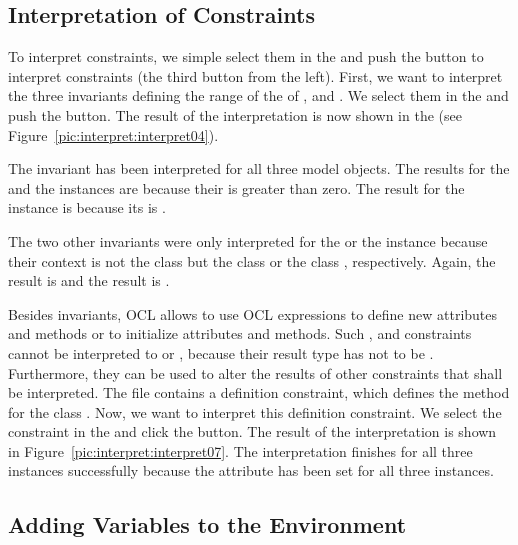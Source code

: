 \subsection{Interpretation of Constraints}

To interpret constraints, we simple select them in the  
and push the button to interpret constraints (the third button from the left). 
First, we want to interpret the three invariants defining the range of the 
 of ,  and . We 
select them in the  and push the  button.
The result of the interpretation is now shown in the  (see Figure~\ref{pic:interpret:interpret04}).

The invariant  has been interpreted for all three model objects.
The results for the  and the  instances are 
 because their  is greater than zero. The result for the
 instance is  because its  is 
.

The two other invariants were only interpreted for the  or the 
 instance because their context is not the class 
 but the class  or the class , 
respectively. Again, the  result is  and the 
 result is .

Besides invariants, \acs{OCL} allows to use \acs{OCL} expressions to
define new attributes and methods or to initialize attributes and methods. Such
,  and  constraints cannot be interpreted to
 or , because their result type has not to be 
. Furthermore, they can be used to alter the results of other 
constraints that shall be interpreted. The  file 
contains a definition constraint, which defines the method  for 
the class . Now, we want to interpret this definition constraint. 
We select the constraint in the  and click the
 button. The result of the interpretation is shown in 
Figure~\ref{pic:interpret:interpret07}. The interpretation finishes for all
three instances successfully because the attribute  has been set for 
all three instances.


\subsection{Adding Variables to the Environment}

